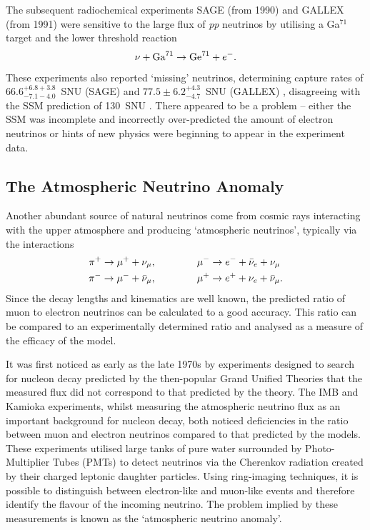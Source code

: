 The subsequent radiochemical experiments SAGE (from 1990) and GALLEX (from 1991) were sensitive to the large flux of \textit{pp} neutrinos by utilising a Ga$^{71}$ target and the lower threshold reaction
\begin{equation}
\nu + \textnormal{Ga}^{71} \rightarrow \textnormal{Ge}^{71} + e^-.
\end{equation}
These experiments also reported `missing' neutrinos, determining capture rates of $66.6^{+6.8+3.8}_{-7.1-4.0}$~SNU (SAGE) \cite{Abdurashitov1994} and $77.5\pm6.2^{+4.3}_{-4.7}$~SNU (GALLEX) \cite{Anselmann1992}, disagreeing with the SSM prediction of 130~SNU \cite{Hampel1999}.  There appeared to be a problem -- either the SSM was incomplete and incorrectly over-predicted the amount of electron neutrinos or hints of new physics were beginning to appear in the experiment data.

\subsection{The Atmospheric Neutrino Anomaly}\label{sec:AtmosphericNeutrinoAnomaly}

Another abundant source of natural neutrinos come from cosmic rays interacting with the upper atmosphere and producing `atmospheric neutrinos', typically via the interactions \cite{Gaisser1990}
\begin{align}
  \pi^+ \rightarrow \mu^+ + \nu_{\mu}, &\hspace{1.5cm} \mu^- \rightarrow e^- + \bar{\nu}_e + \nu_{\mu} \\
  \pi^- \rightarrow \mu^- + \bar{\nu}_{\mu}, &\hspace{1.5cm} \mu^+ \rightarrow e^+ + \nu_e + \bar{\nu}_{\mu}.
\end{align}
Since the decay lengths and kinematics are well known, the predicted ratio of muon to electron neutrinos can be calculated to a good accuracy.  This ratio can be compared to an experimentally determined ratio and analysed as a measure of the efficacy of the model.

It was first noticed as early as the late 1970s by experiments designed to search for nucleon decay predicted by the then-popular Grand Unified Theories that the measured flux did not correspond to that predicted by the theory.  The IMB \cite{Haines1986} and Kamioka \cite{Hirata1988} experiments, whilst measuring the atmospheric neutrino flux as an important background for nucleon decay, both noticed deficiencies in the ratio between muon and electron neutrinos compared to that predicted by the models.  These experiments utilised large tanks of pure water surrounded by Photo-Multiplier Tubes (PMTs) to detect neutrinos via the Cherenkov radiation created by their charged leptonic daughter particles.  Using ring-imaging techniques, it is possible to distinguish between electron-like and muon-like events and therefore identify the flavour of the incoming neutrino.  The problem implied by these measurements is known as the `atmospheric neutrino anomaly'.

